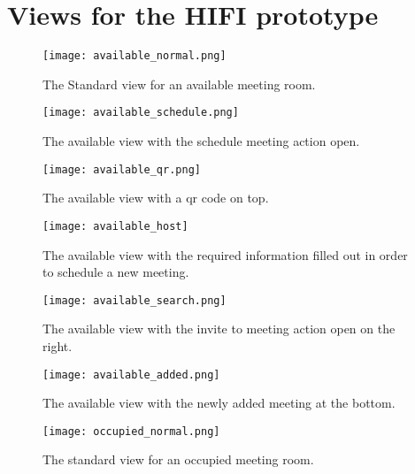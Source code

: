 \section{Views for the HIFI prototype}\label{appendix:hifi_prototype}
\begin{figure}[h!]
    \centering
    \texttt{[image: available\_normal.png]}
    \caption{The Standard view for an available meeting room.}
    \label{fig:available_normal}
  \end{figure}

  \begin{figure}[h!]
    \centering
    \texttt{[image: available\_schedule.png]}
    \caption{The available view with the schedule meeting action open.}
    \label{fig:available_schedule}
  \end{figure}

  \begin{figure}[h!]
    \centering
    \texttt{[image: available\_qr.png]}
    \caption{The available view with a qr code on top.}
    \label{fig:available_qr}
  \end{figure}

  \begin{figure}[h!]
    \centering
    \texttt{[image: available\_host]}
    \caption{The available view with the required information filled out in order to schedule a new meeting.}
    \label{fig:available_host}
  \end{figure}

  \begin{figure}[h!]
    \centering
    \texttt{[image: available\_search.png]}
    \caption{The available view with the invite to meeting action open on the right.}
    \label{fig:available_search}
  \end{figure}

  \begin{figure}[h!]
    \centering
    \texttt{[image: available\_added.png]}
    \caption{The available view with the newly added meeting at the bottom.}
    \label{fig:available_added}
  \end{figure}

  \begin{figure}[h!]
    \centering
    \texttt{[image: occupied\_normal.png]}
    \caption{The standard view for an occupied meeting room.}
    \label{fig:occupied_normal}
  \end{figure}

